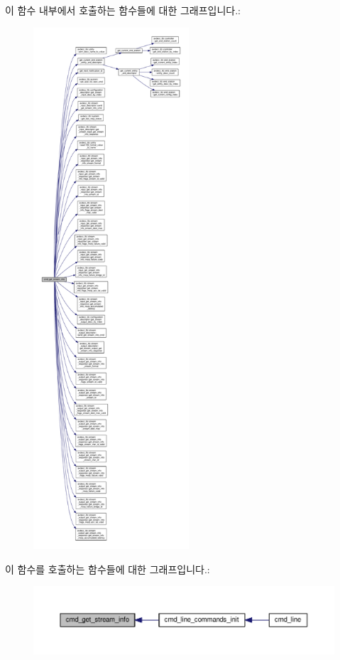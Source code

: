 이 함수 내부에서 호출하는 함수들에 대한 그래프입니다.\+:
\nopagebreak
\begin{figure}[H]
\begin{center}
\leavevmode
\includegraphics[height=550pt]{classcmd__line_ae6972fce5d12e11d46134a3887f91948_cgraph}
\end{center}
\end{figure}




이 함수를 호출하는 함수들에 대한 그래프입니다.\+:
\nopagebreak
\begin{figure}[H]
\begin{center}
\leavevmode
\includegraphics[width=350pt]{classcmd__line_ae6972fce5d12e11d46134a3887f91948_icgraph}
\end{center}
\end{figure}


